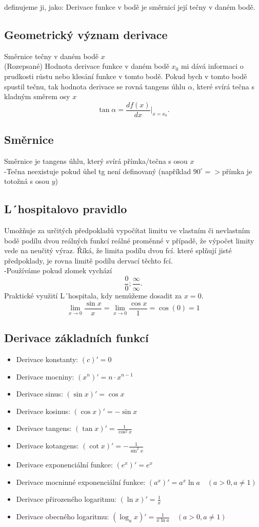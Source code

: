 definujeme ji, jako: Derivace funkce v bodě je směrnicí její tečny v daném bodě.
\subsection{Geometrický význam derivace}
Směrnice tečny v daném bodě $x$\\
(Rozepsané) Hodnota derivace funkce v daném bodě $x_0$ mi dává informaci o prudkosti růstu nebo klesání funkce v tomto bodě. Pokud bych v tomto bodě spustil tečnu, tak hodnota derivace se rovná tangens úhlu $\alpha$, které svírá tečna s kladným směrem osy $x$ 
$$
\tan{\alpha} = \frac{df(x)}{dx}\vert_{x=x_0}.
$$
\subsection{Směrnice}
Směrnice je tangens úhlu, který svírá přímka/tečna s osou $x$\\
-Tečna neexistuje pokud ůhel tg není definovaný (například $90^\circ=>$přímka je totožná s osou $y$)

\subsection{L´hospitalovo pravidlo}
Umožňuje za určitých předpokladů vypočítat limitu ve vlastním či nevlastním bodě podílu dvou reálných funkcí reálné proměnné v případě, že výpočet limity vede na neučitý výraz. Říká, že limita podílu dvou fcí. které splňují jisté předpoklady, je rovna limitě podílu dervací těchto fcí.\\
-Používáme pokud zlomek vychází
$$
\frac{0}{0}; \frac{\infty}{\infty}.
$$
Praktické využití L´hospitala, kdy nemůžeme dosadit za $x=0$.
\[
\lim_{x \to 0} \frac{\sin x}{x} 
= \lim_{x \to 0} \frac{\cos x}{1} 
= \cos(0) = 1
\]
\subsection{Derivace základních funkcí}

\begin{itemize}
  \item Derivace konstanty: \quad \( (c)' = 0 \)
  \item Derivace mocniny: \quad \( (x^n)' = n\cdot x^{n-1} \)
  \item Derivace sinus: \quad \( (\sin x)' = \cos x \)
  \item Derivace kosinus: \quad \( (\cos x)' = -\sin x \)
  \item Derivace tangens: \quad \( (\tan x)' = \frac{1}{\cos^2 x} \)
  \item Derivace kotangens: \quad \( (\cot x)' = -\frac{1}{\sin^2 x} \)
  \item Derivace exponenciální funkce: \quad \( (e^x)' = e^x \)
  \item Derivace mocninné exponenciální funkce: \quad \( (a^x)' = a^x \ln a \quad (a > 0, a \neq 1) \)
  \item Derivace přirozeného logaritmu: \quad \( (\ln x)' = \frac{1}{x} \)
  \item Derivace obecného logaritmu: \quad \( (\log_a x)' = \frac{1}{x \ln a} \quad (a > 0, a \neq 1) \)
\end{itemize}

